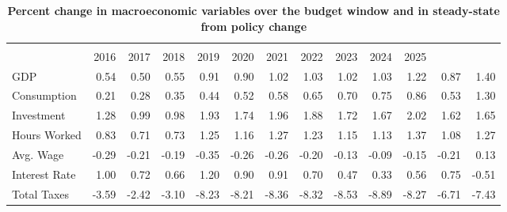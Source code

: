 \documentclass[letterpaper,12pt]{article}
\theoremstyle{definition}
\begin{document}
\begin{spacing}{1.5}{}
  \begin{table}[htbp] \centering \captionsetup{width=5.8in}
    \caption{\label{TabTable1}\textbf{Percent change in macroeconomic variables over the budget window and in steady-state from policy change}}
      \begin{threeparttable}
      \begin{tabular}{>{\scriptsize}l |>{\scriptsize}r >{\scriptsize}r >{\scriptsize}r >{\scriptsize}r >{\scriptsize}r >{\scriptsize}r >{\scriptsize}r >{\scriptsize}r >{\scriptsize}r >{\scriptsize}r |>{\scriptsize}r >{\scriptsize}r}
      \hline\hline
      \multicolumn{1}{c}{\scriptsize{Macroeconomic}} & & & & & & & & & & & \multicolumn{1}{c}{\scriptsize{2016-}} & \\[-2mm]
      \multicolumn{1}{c}{\scriptsize{variables}} & 2016  & 2017  & 2018  & 2019  & 2020  & 2021  & 2022  & 2023  & 2024  & 2025 & \multicolumn{1}{c}{\scriptsize{2025}} & \multicolumn{1}{c}{\scriptsize{SS}} \\
      \hline
      GDP & 0.54  & 0.50  & 0.55  & 0.91  & 0.90  & 1.02  & 1.03  & 1.02  & 1.03  & 1.22  & 0.87  & 1.40 \\
      Consumption & 0.21  & 0.28  & 0.35  & 0.44  & 0.52  & 0.58  & 0.65  & 0.70  & 0.75  & 0.86  & 0.53  & 1.30 \\
      Investment & 1.28  & 0.99  & 0.98  & 1.93  & 1.74  & 1.96  & 1.88  & 1.72  & 1.67  & 2.02  & 1.62  & 1.65 \\
      Hours Worked & 0.83  & 0.71  & 0.73  & 1.25  & 1.16  & 1.27  & 1.23  & 1.15  & 1.13  & 1.37  & 1.08  & 1.27 \\
      \hline
      Avg. Wage & -0.29 & -0.21 & -0.19 & -0.35 & -0.26 & -0.26 & -0.20 & -0.13 & -0.09 & -0.15 & -0.21 & 0.13 \\
      Interest Rate & 1.00  & 0.72  & 0.66  & 1.20  & 0.90  & 0.91  & 0.70  & 0.47  & 0.33  & 0.56 & 0.75  & -0.51 \\
      \hline
      Total Taxes & -3.59 & -2.42 & -3.10 & -8.23 & -8.21 & -8.36 & -8.32 & -8.53 & -8.89 & -8.27 & -6.71 & -7.43 \\
      \hline\hline
    \end{tabular}
    \end{threeparttable}
  \end{table}



\end{spacing}
\end{document}
